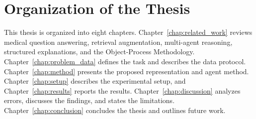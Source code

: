 
\section{Organization of the Thesis}
\label{sec:organization}

This thesis is organized into eight chapters.
Chapter~\ref{chap:related_work} reviews medical question answering, retrieval augmentation, multi-agent reasoning, structured explanations, and the Object-Process Methodology.
Chapter~\ref{chap:problem_data} defines the task and describes the data protocol.
Chapter~\ref{chap:method} presents the proposed representation and agent method.
Chapter~\ref{chap:setup} describes the experimental setup, and Chapter~\ref{chap:results} reports the results.
Chapter~\ref{chap:discussion} analyzes errors, discusses the findings, and states the limitations.
Chapter~\ref{chap:conclusion} concludes the thesis and outlines future work.
